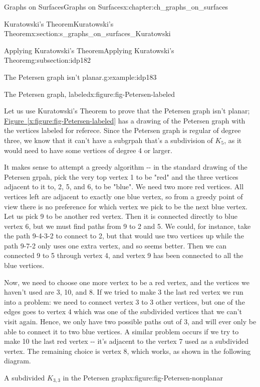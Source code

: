 \documentclass[oneside,10pt,]{book}
\newcommand{\xreffont}{\relax}
\numberwithin{equation}{section}
\begin{document}
\begin{chapterptx}{Graphs on Surfaces}{}{Graphs on Surfaces}{}{}{x:chapter:ch_graphs_on_surfaces}
\begin{sectionptx}{Kuratowski's Theorem}{}{Kuratowski's Theorem}{}{}{x:section:s_graphs_on_surfaces_Kuratowski}
\begin{subsectionptx}{Applying Kuratowski's Theorem}{}{Applying Kuratowski's Theorem}{}{}{g:subsection:idp182}
\begin{example}{The Petersen graph isn't planar.}{g:example:idp183}
\begin{figureptx}{The Petersen graph, labeled}{x:figure:fig-Petersen-labeled}{}
\begin{image}{0.05}{0.9}{0.05}
{\begin{tikzpicture}
\end{tikzpicture}
}%
\end{image}%
\tcblower
\end{figureptx}%
Let us use Kuratowski's Theorem to prove that the Petersen graph isn't planar; \hyperref[x:figure:fig-Petersen-labeled]{Figure~{\xreffont\ref{x:figure:fig-Petersen-labeled}}} has a drawing of the Petersen graph with the vertices labeled for referece.  Since the Petersen graph is regular of degree three, we know that it can't have a subgrpah that's a subdivision of \(K_5\), as it would need to have some vertices of degree 4 or larger.%
\par
It makes sense to attempt a greedy algorithm -{}-{} in the standard drawing of the Petersen grpah, pick the very top vertex 1 to be "red" and the three vertices adjacent to it to, 2, 5, and 6, to be "blue".  We need two more red vertices.  All vertices left are adjacent to exactly one blue vertex, so from a greedy point of view there is no preference for which vertex we pick to be the next blue vertex.  Let us pick 9 to be another red vertex.  Then it is connected directly to blue vertex 6, but we must find paths from 9 to 2 and 5.  We could, for instance, take the path 9-4-3-2 to connect to 2, but that would use two vertices up while the path 9-7-2 only uses one extra vertex, and so seems better.  Then we can connected 9 to 5 through vertex 4, and vertex 9 has been connected to all the blue vertices.%
\par
Now, we need to choose one more vertex to be a red vertex, and the vertices we haven't used are 3, 10, and 8.  If we tried to make 3 the last red vertex we run into a problem: we need to connect vertex 3 to 3 other vertices, but one of the edges goes to vertex 4 which was one of the subdivided vertices that we can't visit again.  Hence, we only have two possible paths out of 3, and will ever only be able to connect it to two blue vertices.  A similar problem occurs if we try to make 10 the last red vertex -{}-{} it's adjacent to the vertex 7 used as a subdivided vertex.  The remaining choice is vertex 8, which works, as shown in the following diagram.%
\begin{figureptx}{A subdivided \(K_{3,3}\) in the Petersen graph}{x:figure:fig-Petersen-nonplanar}{}%
\begin{image}{0.05}{0.9}{0.05}%
\resizebox{\linewidth}{!}{%
\begin{tikzpicture}


\end{tikzpicture}}
\end{image}
\end{figureptx}
\end{example}
\end{subsectionptx}
\end{sectionptx}
\end{chapterptx}
\end{document}
